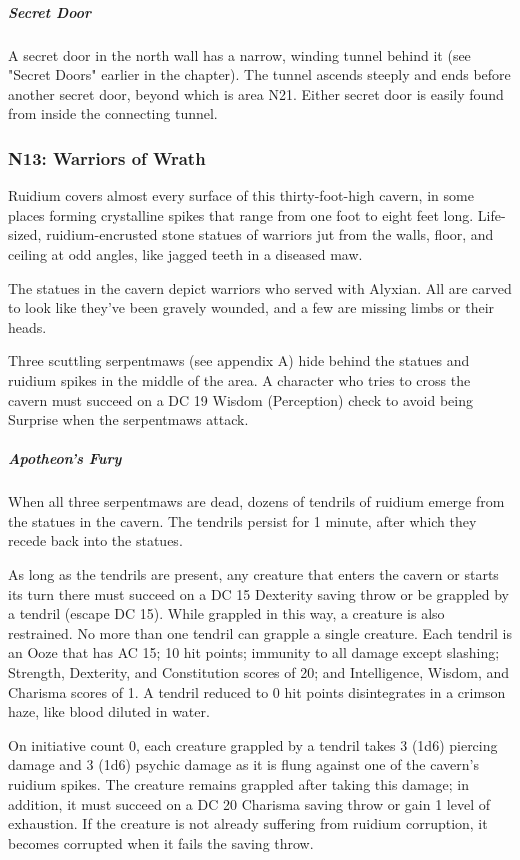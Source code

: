 \documentclass[10pt,a4paper,twoside,fancy,bg=print,twocolumn,openany,nodeprecatedcode]{dndbook}
\begin{document}
\subparagraph{Secret Door}
A secret door in the north wall has a narrow, winding tunnel behind it (see "Secret Doors" earlier in the chapter). The tunnel ascends steeply and ends before another secret door, beyond which is area N21. Either secret door is easily found from inside the connecting tunnel.

\subsubsection{N13: Warriors of Wrath}
\begin{DndReadAloud}{}
Ruidium covers almost every surface of this thirty-foot-high cavern, in some places forming crystalline spikes that range from one foot to eight feet long. Life-sized, ruidium-encrusted stone statues of warriors jut from the walls, floor, and ceiling at odd angles, like jagged teeth in a diseased maw.

\end{DndReadAloud}

The statues in the cavern depict warriors who served with Alyxian. All are carved to look like they've been gravely wounded, and a few are missing limbs or their heads.

Three scuttling serpentmaws (see appendix A) hide behind the statues and ruidium spikes in the middle of the area. A character who tries to cross the cavern must succeed on a DC 19 Wisdom (Perception) check to avoid being Surprise when the serpentmaws attack.

\subparagraph{Apotheon's Fury}
When all three serpentmaws are dead, dozens of tendrils of ruidium emerge from the statues in the cavern. The tendrils persist for 1 minute, after which they recede back into the statues.

As long as the tendrils are present, any creature that enters the cavern or starts its turn there must succeed on a DC 15 Dexterity saving throw or be grappled by a tendril (escape DC 15). While grappled in this way, a creature is also restrained. No more than one tendril can grapple a single creature. Each tendril is an Ooze that has AC 15; 10 hit points; immunity to all damage except slashing; Strength, Dexterity, and Constitution scores of 20; and Intelligence, Wisdom, and Charisma scores of 1. A tendril reduced to 0 hit points disintegrates in a crimson haze, like blood diluted in water.

On initiative count 0, each creature grappled by a tendril takes 3 (1d6) piercing damage and 3 (1d6) psychic damage as it is flung against one of the cavern's ruidium spikes. The creature remains grappled after taking this damage; in addition, it must succeed on a DC 20 Charisma saving throw or gain 1 level of exhaustion. If the creature is not already suffering from ruidium corruption, it becomes corrupted when it fails the saving throw.
\end{document}
